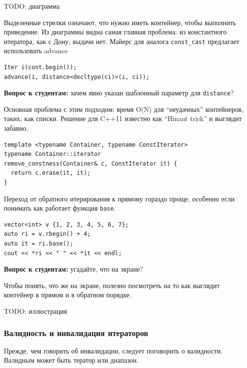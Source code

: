 \documentclass[a4paper,12pt,oneside]{article}
\newif\ifanswers
\begin{document}
TODO: диаграмма

Выделенные стрелки означают, что нужно иметь контейнер, чтобы выполнить приведение. Из диаграммы видна самая главная проблема: из константного итератора, как с Дону, выдачи нет. Майерс для аналога \lstinline!const_cast! предлагает использовать advance

\begin{lstlisting}
Iter i(cont.begin());
advance(i, distance<decltype(ci)>(i, ci));
\end{lstlisting}

\textbf{Вопрос к студентам:} зачем явно указан шаблонный параметр для \lstinline!distance!?

\ifanswers
Чтобы избежать неоднозначности вывода типов межу итератором и константным итератором
\fi

Основная проблема с этим подходом: время O(N) для ``неудачных'' контейнеров, таких, как списки. Решение для C++11 известно как ``Hinant trick'' и выглядит забавно.

\begin{lstlisting}
template <typename Container, typename ConstIterator>
typename Container::iterator 
remove_constness(Container& c, ConstIterator it) {
  return c.erase(it, it);
}
\end{lstlisting}

Переход от обратного итерирования к прямому гораздо проще, особенно если понимать как работает функция \lstinline!base!.

\begin{lstlisting}
vector<int> v {1, 2, 3, 4, 5, 6, 7};
auto ri = v.rbegin() + 4; 
auto it = ri.base();
cout << *ri << " " << *it << endl;
\end{lstlisting}

\textbf{Вопрос к студентам:} угадайте, что на экране?

\ifanswers
ответ 3 и 4, пояснения см. далее в тексте
\fi

Чтобы понять, что же на экране, полезно посмотреть на то как выглядит контейнер в прямом и в обратном порядке.

TODO: иллюстрация

\subsubsection{Валидность и инвалидация итераторов}\label{subsub:valinval}

Прежде, чем говорить об инвалидации, следует поговорить о валидности. Валидным может быть тератор или диапазон.
\end{document}
